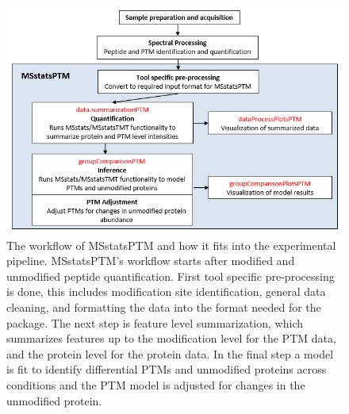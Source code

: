 \documentclass[mcp]{article}
\numberwithin{table}{section}
\begin{document}

\begin{figure}[ht]
\centering
\includegraphics[scale=.8]{images/MSstatsPTM_design.png}
\caption{The workflow of MSstatsPTM and how it fits into the experimental pipeline. MSstatsPTM's workflow starts after modified and unmodified peptide quantification. First tool specific pre-processing is done, this includes modification site identification, general data cleaning, and formatting the data into the format needed for the package. The next step is feature level summarization, which summarizes features up to the modification level for the PTM data, and the protein level for the protein data. In the final step a model is fit to identify differential PTMs and unmodified proteins across conditions and the PTM model is adjusted for changes in the unmodified protein.}
\label{fig:msstatsptm_design}
\end{figure}
\end{document}

